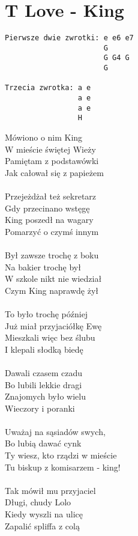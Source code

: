 \section{T Love - King}
\begin{verbatim}
Pierwsze dwie zwrotki: e e6 e7
                       G
                       G G4 G
                       G

Trzecia zwrotka: a e
                 a e
                 a e
                 H
\end{verbatim}
Mówiono o nim King \\
W mieście świętej Wieży\\
Pamiętam z podstawówki \\
Jak całował się z papieżem \\
\\
Przejeżdżał też sekretarz\\
Gdy przecinano wstęgę\\
King poszedł na wagary\\
Pomarzyć o czymś innym\\
\\
Był zawsze trochę z boku \\
Na bakier trochę był\\
W szkole nikt nie wiedział\\
Czym King naprawdę żył \\
\\
To było trochę później\\
Już miał przyjaciółkę Ewę\\
Mieszkali więc bez ślubu\\
I klepali słodką biedę\\
\\
Dawali czasem czadu\\
Bo lubili lekkie dragi\\
Znajomych było wielu\\
Wieczory i poranki\\
\\
Uważaj na sąsiadów swych,\\
Bo lubią dawać cynk\\
Ty wiesz, kto rządzi w mieście\\
Tu biskup z komisarzem - king!\\
\\
Tak mówił mu przyjaciel\\
Długi, chudy Lolo\\
Kiedy wyszli na ulicę\\
Zapalić spliffa z colą\\
